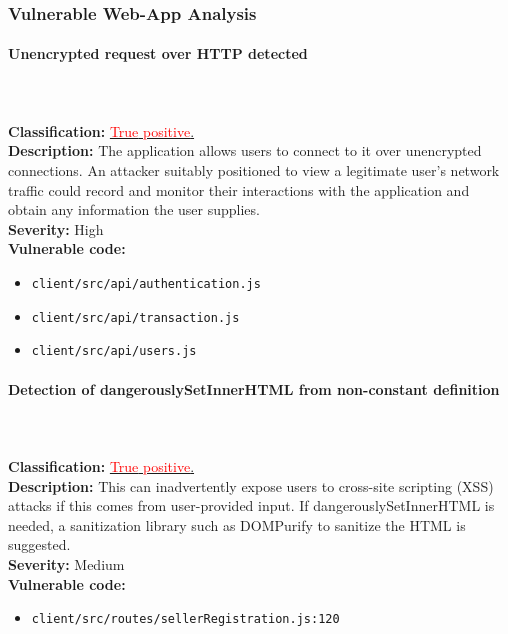 \documentclass[]{article}
\begin{document}
\subsubsection{Vulnerable Web-App Analysis}
\paragraph{Unencrypted request over HTTP detected} \mbox{} \\ \\
\textbf{Classification:} \hyperref[subsubsec:cleartext_transmission_of_sensitive_information]{\textcolor{red}{True} \textcolor{red}{positive}.} \\
\textbf{Description:}  The application allows users to connect to it over unencrypted connections. An attacker suitably positioned to view a legitimate user's network traffic could record and monitor their interactions with the application and obtain any information the user supplies. \\ 
\textbf{Severity:}  High \\ 
\textbf{Vulnerable code:}
\begin{itemize}
    \item \texttt{client/src/api/authentication.js}
    \item \texttt{client/src/api/transaction.js}
    \item \texttt{client/src/api/users.js}
\end{itemize}

\paragraph{Detection of dangerouslySetInnerHTML from non-constant definition} \mbox{} \\ \\
\textbf{Classification:} \hyperref[par:stored_xss]{\textcolor{red}{True} \textcolor{red}{positive}.} \\ 
\textbf{Description:} This can inadvertently expose users to cross-site scripting (XSS) attacks if this comes from user-provided input. If dangerouslySetInnerHTML is needed, a sanitization library such as DOMPurify to sanitize the HTML is suggested. \\ 
\textbf{Severity:}  Medium \\ 
\textbf{Vulnerable code:}
\begin{itemize}
    \item \texttt{client/src/routes/sellerRegistration.js:120}
\end{itemize}
\end{document}
